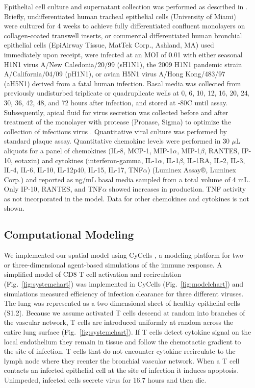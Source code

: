 \documentclass[10pt]{article}
\begin{document}
Epithelial cell culture and supernatant collection was performed as described in \cite{Mitchell2011}.  Briefly, undifferentiated human tracheal epithelial cells (University of Miami) were cultured for 4 weeks to achieve fully differentiated confluent monolayers on collagen-coated transwell inserts, or commercial differentiated human bronchial epithelial cells (EpiAirway Tissue, MatTek Corp., Ashland, MA) used immediately upon receipt, were infected at an MOI of 0.01 with either seasonal H1N1 virus A/New Caledonia/20/99 (sH1N1), the 2009 H1N1 pandemic strain A/California/04/09 (pH1N1), or avian H5N1 virus A/Hong Kong/483/97 (aH5N1) derived from a fatal human infection.  Basal media was collected from previously undisturbed triplicate or quadruplicate wells at 0, 6, 10, 12, 16, 20, 24, 30, 36, 42, 48, and 72 hours after infection, and stored at -80C until assay.  Subsequently, apical fluid for virus secretion was collected before and after treatment of the monolayer with protease (Pronase, Sigma) to optimize the collection of infectious virus \cite{Mitchell2011}.  Quantitative viral culture was performed by standard plaque assay.  Quantitative chemokine levels were performed in 30 $\mu$L aliquots for a panel of chemokines (IL-8, MCP-1, MIP-1$\alpha$, MIP-1$\beta$, RANTES, IP-10, eotaxin) and cytokines (interferon-gamma, IL-1$\alpha$, IL-1$\beta$, IL-1RA, IL-2, IL-3, IL-4, IL-6, IL-10, IL-12p40, IL-15, IL-17, TNF$\alpha$) (Luminex Assay®, Luminex Corp.) and reported as ng/mL basal media sampled from a total volume of 4 mL.  Only IP-10, RANTES, and TNF$\alpha$ showed increases in production.  TNF activity as not incorporated in the model.  Data for other chemokines and cytokines is not shown.

\subsection*{Computational Modeling}

We implemented our spatial model using CyCells \cite{Warrender2006}, a modeling platform for two- or three-dimensional agent-based simulations of the immune response.  A simplified model of CD8 T cell activation and recirculation (Fig.~\ref{fig:systemchart}) was implemented in CyCells (Fig.~\ref{fig:modelchart}) and simulations measured efficiency of infection clearance for three different viruses. The lung was represented as a two-dimensional sheet of healthy epithelial cells (S1.2).  Because we assume activated T cells descend at random into branches of the vascular network, T cells are introduced uniformly at random across the entire lung surface (Fig.~\ref{fig:systemchart}).  If T cells detect cytokine signal on the local endothelium they remain in tissue and follow the chemotactic gradient to the site of infection. T cells that do not encounter cytokine recirculate to the lymph node where they reenter the bronchial vascular network.  When a T cell contacts an infected epithelial cell at the site of infection it induces apoptosis.  Unimpeded, infected cells secrete virus for 16.7 hours and then die.
\end{document}
